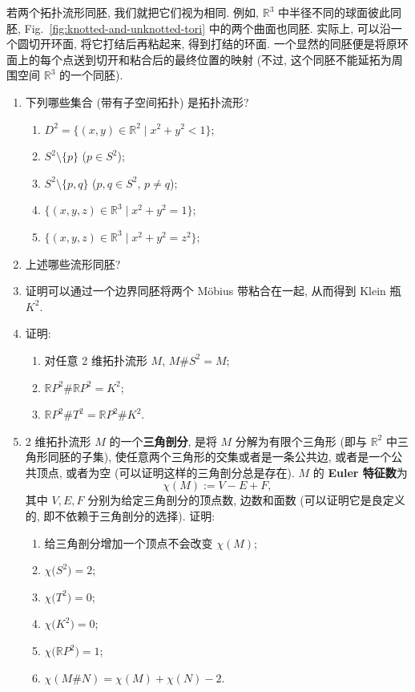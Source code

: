 若两个拓扑流形同胚, 我们就把它们视为相同. 例如, $\mathbb{R}^3$ 中半径不同的球面彼此同胚, Fig.~\ref{fig:knotted-and-unknotted-tori} 中的两个曲面也同胚. 实际上, 可以沿一个圆切开环面, 将它打结后再粘起来, 得到打结的环面. 一个显然的同胚便是将原环面上的每个点送到切开和粘合后的最终位置的映射 (不过, 这个同胚不能延拓为周围空间 $\mathbb{R}^3$ 的一个同胚).


\begin{RiemannExercise}\label{ex:topological-manifolds}
\begin{enumerate}[label=(\arabic*),ref=\arabic*,leftmargin=*]
\item\label{ex:recognize-topological-manifolds} 下列哪些集合 (带有子空间拓扑) 是拓扑流形?
\begin{enumerate}[label=(\alph*),leftmargin=*]
\item $D^2=\{(x,y)\in\mathbb{R}^2\mid x^2+y^2<1\}$;
\item $S^2\setminus\{p\}$ ($p\in S^2$);
\item $S^2\setminus\{p,q\}$ ($p,q\in S^2$, $p\ne q$);
\item $\{(x,y,z)\in\mathbb{R}^3\mid x^2+y^2=1\}$;
\item $\{(x,y,z)\in\mathbb{R}^3\mid x^2+y^2=z^2\}$;
\end{enumerate}
\item\label{ex:classify-topological-manifolds} 上述哪些流形同胚?
\item\label{ex:klein-bottle-from-mobius-bands} 证明可以通过一个边界同胚将两个 Möbius 带粘合在一起, 从而得到 Klein 瓶 $K^2$.
\item\label{ex:connected-sum-identities} 证明:
\begin{enumerate}[label=(\alph*),leftmargin=*]
\item 对任意 2 维拓扑流形 $M$, $M\#S^2=M$;
\item $\mathbb{R}P^2\#\mathbb{R}P^2=K^2$;
\item $\mathbb{R}P^2\#T^2=\mathbb{R}P^2\#K^2$.
\end{enumerate}
\item\label{ex:euler-characteristic-of-surfaces} 2 维拓扑流形 $M$ 的一个\textbf{三角剖分}, 是将 $M$ 分解为有限个三角形 (即与 $\mathbb{R}^2$ 中三角形同胚的子集), 使任意两个三角形的交集或者是一条公共边, 或者是一个公共顶点, 或者为空 (可以证明这样的三角剖分总是存在). $M$ 的 \textbf{Euler 特征数}为
\[
  \chi(M):=V-E+F,
\]
其中 $V,E,F$ 分别为给定三角剖分的顶点数, 边数和面数 (可以证明它是良定义的, 即不依赖于三角剖分的选择). 证明:
\begin{enumerate}[label=(\alph*),leftmargin=*]
\item 给三角剖分增加一个顶点不会改变 $\chi(M)$;
\item $\chi\bigl(S^2\bigr)=2$;
\item $\chi\bigl(T^2\bigr)=0$;
\item $\chi\bigl(K^2\bigr)=0$;
\item $\chi\bigl(\mathbb{R}P^2\bigr)=1$;
\item $\chi(M\#N)=\chi(M)+\chi(N)-2$.
\end{enumerate}
\end{enumerate}
\end{RiemannExercise}
